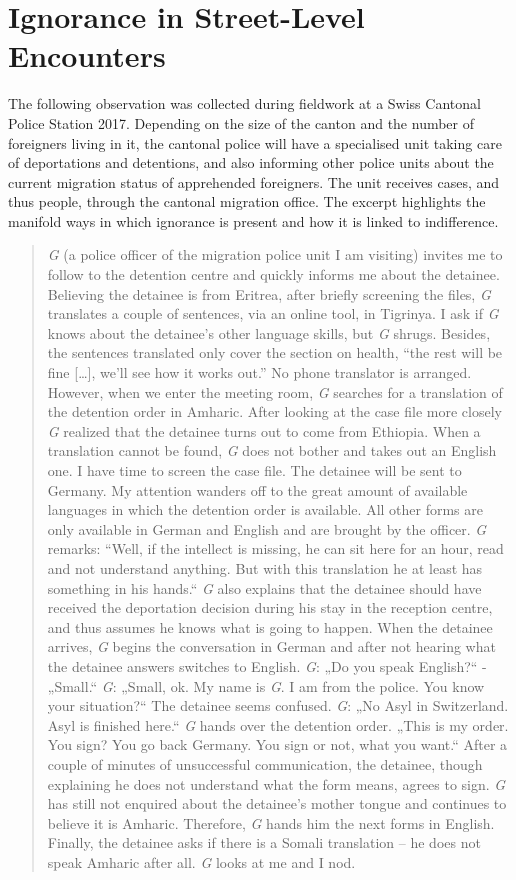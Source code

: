 \chapter{Ignorance in Street-Level Encounters}
The following observation was collected during fieldwork at a Swiss Cantonal Police Station 2017. Depending on the size of the canton and the number of foreigners living in it, the cantonal police will have a specialised unit taking care of deportations and detentions, and also informing other police units about the current migration status of apprehended foreigners. The unit receives cases, and thus people, through the cantonal migration office. The excerpt highlights the manifold ways in which ignorance is present and how it is linked to indifference. 
    \blockquote{\emph{G} (a police officer of the migration police unit I am visiting) invites me to follow to the detention centre and quickly informs me about the detainee. Believing the detainee is from Eritrea, after briefly screening the files, \emph{G} translates a couple of sentences, via an online tool, in Tigrinya. I ask if \emph{G} knows about the detainee’s other language skills, but \emph{G} shrugs. Besides, the sentences translated only cover the section on health, “the rest will be fine […], we’ll see how it works out.” No phone translator is arranged. However, when we enter the meeting room, \emph{G} searches for a translation of the detention order in Amharic. After looking at the case file more closely \emph{G} realized that the detainee turns out to come from Ethiopia. When a translation cannot be found, \emph{G} does not bother and takes out an English one. I have time to screen the case file. The detainee will be sent to Germany. My attention wanders off to the great amount of available languages in which the detention order is available. All other forms are only available in German and English and are brought by the officer. \emph{G} remarks: “Well, if the intellect is missing, he can sit here for an hour, read and not understand anything. But with this translation he at least has something in his hands.“ \emph{G} also explains that the detainee should have received the deportation decision during his stay in the reception centre, and thus assumes he knows what is going to happen. When the detainee arrives, \emph{G} begins the conversation in German and after not hearing what the detainee answers switches to English. \emph{G}: „Do you speak English?“ - „Small.“ \emph{G}: „Small, ok. My name is \emph{G}. I am from the police. You know your situation?“ The detainee seems confused. \emph{G}: „No Asyl in Switzerland. Asyl is finished here.“ \emph{G} hands over the detention order. „This is my order. You sign? You go back Germany. You sign or not, what you want.“ After a couple of minutes of unsuccessful communication, the detainee, though explaining he does not understand what the form means, agrees to sign. \emph{G} has still not enquired about the detainee’s mother tongue and continues to believe it is Amharic. Therefore, \emph{G} hands him the next forms in English. Finally, the detainee asks if there is a Somali translation – he does not speak Amharic after all. \emph{G} looks at me and I nod.
}
